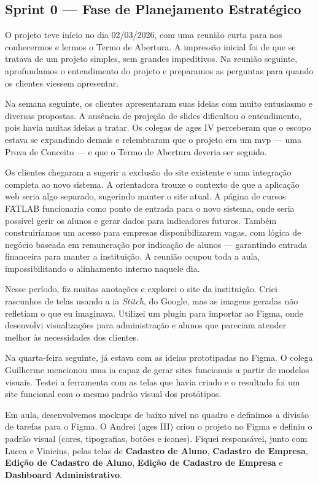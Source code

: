 \subsection{Sprint 0 --- Fase de Planejamento Estratégico}

O projeto teve início no dia 02/03/2026, com uma reunião curta para nos conhecermos e
lermos o Termo de Abertura. A impressão inicial foi de que se tratava de um projeto
simples, sem grandes impeditivos. Na reunião seguinte, aprofundamos o entendimento do
projeto e preparamos as perguntas para quando os clientes viessem apresentar.

Na semana seguinte, os clientes apresentaram suas ideias com muito entusiasmo e diversas
propostas. A ausência de projeção de slides dificultou o entendimento, pois havia muitas
ideias a tratar. Os colegas de \ac{ages} IV perceberam que o escopo estava se expandindo
demais e relembraram que o projeto era um \ac{mvp} --- uma Prova de Conceito --- e que o
Termo de Abertura deveria ser seguido.

Os clientes chegaram a sugerir a exclusão do site existente e uma integração completa ao
novo sistema. A orientadora trouxe o contexto de que a aplicação web seria algo separado,
sugerindo manter o site atual. A página de cursos FATLAB funcionaria como ponto de
entrada para o novo sistema, onde seria possível gerir os alunos e gerar dados para
indicadores futuros. Também construiríamos um acesso para empresas disponibilizarem
vagas, com lógica de negócio baseada em remuneração por indicação de alunos ---
garantindo entrada financeira para manter a instituição. A reunião ocupou toda a aula,
impossibilitando o alinhamento interno naquele dia.

Nesse período, fiz muitas anotações e explorei o site da instituição. Criei rascunhos de
telas usando a \ac{ia} \textit{Stitch}, do Google, mas as imagens geradas não refletiam o que
eu imaginava. Utilizei um plugin para importar ao Figma, onde desenvolvi visualizações
para administração e alunos que pareciam atender melhor às necessidades dos clientes.

Na quarta-feira seguinte, já estava com as ideias prototipadas no Figma. O colega
Guilherme mencionou uma \ac{ia} capaz de gerar sites funcionais a partir de modelos visuais.
Testei a ferramenta com as telas que havia criado e o resultado foi um site funcional com
o mesmo padrão visual dos protótipos.

Em aula, desenvolvemos mockups de baixo nível no quadro e definimos a divisão de
tarefas para o Figma. O Andrei (\ac{ages} III) criou o projeto no Figma e definiu o padrão
visual (cores, tipografias, botões e ícones). Fiquei responsável, junto com Lucca e
Vinicius, pelas telas de \textbf{Cadastro de Aluno}, \textbf{Cadastro de Empresa},
\textbf{Edição de Cadastro de Aluno}, \textbf{Edição de Cadastro de Empresa} e
\textbf{Dashboard Administrativo}.

